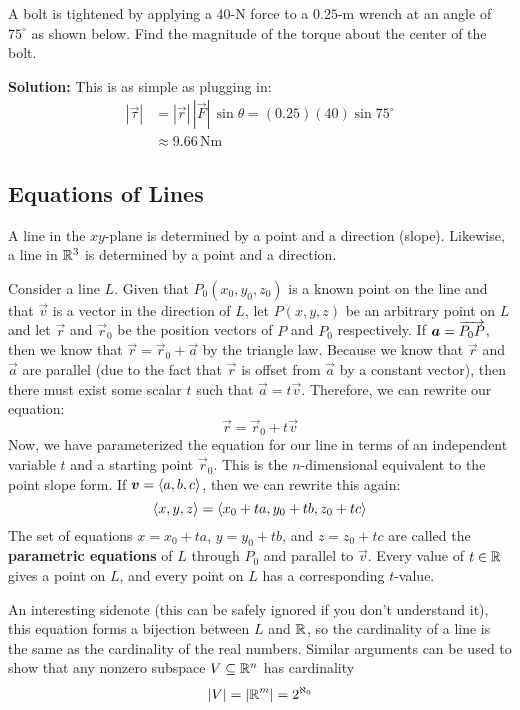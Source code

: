 \begin{example}
    A bolt is tightened by applying a \(40\)-N force to a \(0.25\)-m wrench at an angle of \(75^{\circ}\) as shown below. Find the magnitude of the torque about the center of the bolt.
    \par
    \textbf{Solution:} This is as simple as plugging in:
    \begin{align*}
        |\vec \tau| &= |\vec r|\, |\vec F|\, \sin\theta = (0.25)(40)\sin 75^\circ \\
        &\approx 9.66 \,\text{Nm}
    \end{align*}
\end{example}
\subsection{Equations of Lines}
A line in the \(xy\)-plane is determined by a point and a direction (slope). Likewise, a line in \(\mathbb{R}^3\) is determined by a point and a direction. \par 
Consider a line \(L\). Given that \(P_0(x_0,y_0,z_0)\) is a known point on the line and that \(\vec v\) is a vector in the direction of \(L\), let \(P(x,y,z)\) be an arbitrary point on \(L\) and let \(\vec r\) and \(\vec r_0\) be the position vectors of \(P\) and \(P_0\) respectively. If \(\boldsymbol{a} = \overrightarrow{P_0P}\), then we know that \(\vec r=\vec r_0+\vec a\) by the triangle law. Because we know that \(\vec r\) and \(\vec a\) are parallel (due to the fact that \(\vec r\) is offset from \(\vec a\) by a constant vector), then there must exist some scalar \(t\) such that \(\vec a = t\vec v\). Therefore, we can rewrite our equation:
\[\vec r = \vec r_0+t\vec v\]
Now, we have parameterized the equation for our line in terms of an independent variable \(t\) and a starting point \(\vec r_0\). This is the \(n\)-dimensional equivalent to the point slope form. If \(\boldsymbol{v} = \left\langle a,b,c\right\rangle\), then we can rewrite this again:
\[\left\langle x,y,z\right\rangle = \left\langle x_0+ta, y_0+tb, z_0+tc\right\rangle\]
The set of equations \(x=x_0+ta\), \(y=y_0+tb\), and \(z=z_0+tc\) are called the \textbf{parametric equations} of \(L\) through \(P_0\) and parallel to \(\vec v\). Every value of \(t\in\mathbb{R}\) gives a point on \(L\), and every point on \(L\) has a corresponding \(t\)-value. \par 
An interesting sidenote (this can be safely ignored if you don't understand it), this equation forms a bijection between \(L\) and \(\mathbb{R}\), so the cardinality of a line is the same as the cardinality of the real numbers. Similar arguments can be used to show that any nonzero subspace \(V\subseteq \mathbb{R}^n\) has cardinality \[|V|=|\boldsymbol{\mathbb{R}}^m|=2^{\aleph_0}\]
